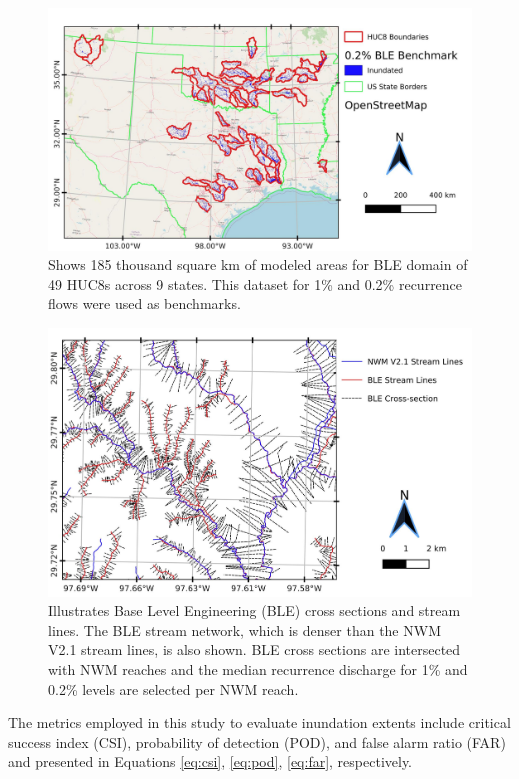 \begin{figure}[h!]
\centering
\includegraphics[scale=1.0]{figures/all_ble_maps.jpg}
\caption{Shows 185 thousand square km of modeled areas for BLE domain of 49 HUC8s across 9 states. This dataset for 1\% and 0.2\% recurrence flows were used as benchmarks.}
\label{fig:all_ble_maps}
\end{figure}
%
\begin{figure}[h!]
\centering
\includegraphics[scale=1.0]{figures/ble_evaluation_method.jpg}
\caption{Illustrates Base Level Engineering (BLE) cross sections and stream lines. The BLE stream network, which is denser than the NWM V2.1 stream lines, is also shown. BLE cross sections are intersected with NWM reaches and the median recurrence discharge for 1\% and 0.2\% levels are selected per NWM reach. }
\label{fig:ble_evaluation_method}
\end{figure}
%
The metrics employed in this study to evaluate inundation extents include critical success index (CSI), probability of detection (POD), and false alarm ratio (FAR) and presented in Equations \ref{eq:csi}, \ref{eq:pod}, \ref{eq:far}, respectively.
